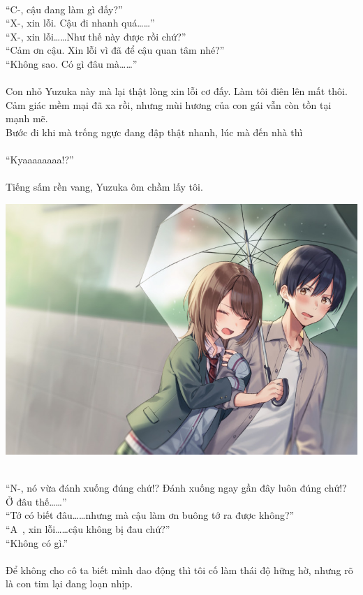 \documentclass[12pt,a4paper, twosides]{book}
\begin{document}
\\
“C-, cậu đang làm gì đấy?”\\
“X-, xin lỗi. Cậu đi nhanh quá……”\\
“X-, xin lỗi……Như thế này được rồi chứ?”\\
“Cảm ơn cậu. Xin lỗi vì đã để cậu quan tâm nhé?”\\
“Không sao. Có gì đâu mà……”\\
\\
Con nhỏ Yuzuka này mà lại thật lòng xin lỗi cơ đấy. Làm tôi điên lên mất thôi.\\
Cảm giác mềm mại đã xa rồi, nhưng mùi hương của con gái vẫn còn tồn tại mạnh mẽ.\\
Bước đi khi mà trống ngực đang đập thật nhanh, lúc mà đến nhà thì\\
\\
“Kyaaaaaaaa!?”\\
\\
Tiếng sấm rền vang, Yuzuka ôm chầm lấy tôi.\\
\begin{center}
\includegraphics[width=\textwidth]{assets/u6440-7332b46f-e0f7-4bd4-9b9e-b153d3bf1de5.jpg}
\end{center}
\\
“N-, nó vừa đánh xuống đúng chứ!? Đánh xuống ngay gần đây luôn đúng chứ!? Ở đâu thế……”\\
“Tớ có biết đâu……nhưng mà cậu làm ơn buông tớ ra được không?”\\
“A~, xin lỗi……cậu không bị đau chứ?”\\
“Không có gì.”\\
\\
Để không cho cô ta biết mình dao động thì tôi cố làm thái độ hững hờ, nhưng rõ là con tim lại đang loạn nhịp.\\
\end{document}
